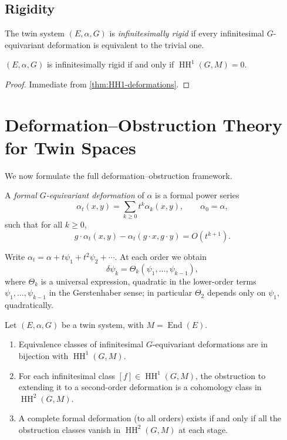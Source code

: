 \documentclass[11pt,a4paper]{article}
\numberwithin{equation}{section}
\DeclareMathOperator{\End}{End}
\DeclareMathOperator{\HH}{HH}
\newcommand{\TwinSpace}{(E,\alpha,G)}
\newcommand{\diff}{\delta}
\begin{document}
	\subsection{Rigidity}
	
	\begin{definition}
		The twin system $\TwinSpace$ is \emph{infinitesimally rigid} if every infinitesimal
		$G$-equivariant deformation is equivalent to the trivial one.
	\end{definition}
	
	\begin{corollary}\label{cor:rigidity-HH1}
		$\TwinSpace$ is infinitesimally rigid if and only if $\HH^1(G,M)=0$.
	\end{corollary}
	
	\begin{proof}
		Immediate from \cref{thm:HH1-deformations}.
	\end{proof}
	
	\section{Deformation--Obstruction Theory for Twin Spaces}
	\label{sec:def-obs}
	
	We now formulate the full deformation--obstruction framework.
	
	\begin{definition}
		A \emph{formal $G$-equivariant deformation} of $\alpha$ is a formal power series
		\[
		\alpha_t(x,y) = \sum_{k\ge 0} t^k \alpha_k(x,y), \qquad \alpha_0=\alpha,
		\]
		such that for all $k\ge 0$,
		\[
		g\cdot\alpha_t(x,y) - \alpha_t(g\cdot x,g\cdot y) = O(t^{k+1}).
		\]
	\end{definition}
	
	Write $\alpha_t=\alpha + t\psi_1 + t^2\psi_2 + \cdots$. At each order we obtain
	\[
	\diff \psi_k = \Theta_k(\psi_1,\dots,\psi_{k-1}),
	\]
	where $\Theta_k$ is a universal expression, quadratic in the lower-order terms $\psi_1,\dots,\psi_{k-1}$ in the Gerstenhaber sense; in particular $\Theta_2$ depends only on $\psi_1$, quadratically.
	
	\begin{theorem}\label{thm:def-obs}
		Let $\TwinSpace$ be a twin system, with $M=\End(E)$.
		\begin{enumerate}[label=(\roman*)]
			\item Equivalence classes of infinitesimal $G$-equivariant deformations
			are in bijection with $\HH^1(G,M)$.
			\item For each infinitesimal class $[f]\in \HH^1(G,M)$, the obstruction to extending it
			to a second-order deformation is a cohomology class in $\HH^2(G,M)$.
			\item A complete formal deformation (to all orders) exists if and only if all the
			obstruction classes vanish in $\HH^2(G,M)$ at each stage.
		\end{enumerate}
	\end{theorem}
	
\end{document}

